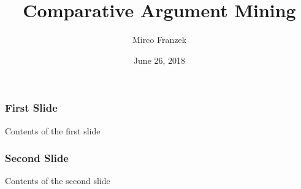 \documentclass[11pt]{beamer}
\title{Comparative Argument Mining}
\author{Mirco Franzek}
\date{June 26, 2018}
\begin{document}
    \maketitle
    \begin{frame}
        \frametitle{First Slide}
        Contents of the first slide
    \end{frame}
    \begin{frame}
        \frametitle{Second Slide}
        Contents of the second slide
    \end{frame}
\end{document}
